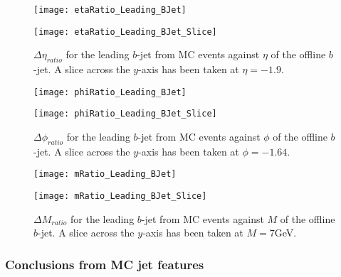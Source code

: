 		\begin{figure}[h]
			\centering
			
			\begin{minipage}[h]{0.33\linewidth}
				\texttt{[image: etaRatio\_Leading\_BJet]}
			\end{minipage}
			\quad
			\begin{minipage}[h]{0.33\linewidth}
				\texttt{[image: etaRatio\_Leading\_BJet\_Slice]}
			\end{minipage}
			\caption{$\Delta \eta_{ratio}$ for the leading \pt $b$-jet from MC events against $\eta$ of the offline $b$-jet. A slice across the $y$-axis has been taken at $\eta=-1.9$. }
			\label{fig:MC:leadingbeta}
		\end{figure}
		
			\begin{figure}[h]
				\centering
				
				\begin{minipage}[h]{0.33\linewidth}
					\texttt{[image: phiRatio\_Leading\_BJet]}
				\end{minipage}
				\quad
				\begin{minipage}[h]{0.33\linewidth}
					\texttt{[image: phiRatio\_Leading\_BJet\_Slice]}
				\end{minipage}
			\caption{$\Delta \phi_{ratio}$ for the leading \pt $b$-jet from MC events against $\phi$ of the offline $b$-jet. A slice across the $y$-axis has been taken at $\phi=-1.64$. }
			\label{fig:MC:leadingbphi}
			\end{figure}
			
			\begin{figure}[h]
				\centering
				
				\begin{minipage}[h]{0.33\linewidth}
					\texttt{[image: mRatio\_Leading\_BJet]}
				\end{minipage}
				\quad
				\begin{minipage}[h]{0.33\linewidth}
					\texttt{[image: mRatio\_Leading\_BJet\_Slice]}
				\end{minipage}
			\caption{$\Delta M_{ratio}$ for the leading \pt $b$-jet from MC events against $M$ of the offline $b$-jet. A slice across the $y$-axis has been taken at $M=7$GeV. }
			\label{fig:MC:leadingbm}
			\end{figure}
			
		\subsubsection{Conclusions from MC jet features}
	
